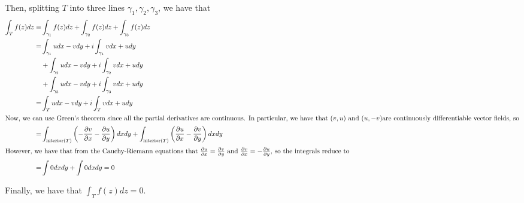 \documentclass[12pt,letterpaper]{article}
\theoremstyle{definition}
\begin{document}
Then, splitting $T$ into three lines $\gamma_{1}, \gamma_{2}, \gamma_{3}$, we have that
\begin{align*}
  \int_{T}f(z)dz =& \int_{\gamma_{1}}f(z)dz + \int_{\gamma_{2}}f(z)dz + \int_{\gamma_{3}}f(z)dz \\
  =& \int_{\gamma_{1}}udx - vdy + i\int_{\gamma_{1}}vdx + udy \\
  &+ \int_{\gamma_{2}}udx - vdy + i\int_{\gamma_{2}}vdx + udy \\
  &+ \int_{\gamma_{3}}udx - vdy + i\int_{\gamma_{3}}vdx + udy \\
  =& \int_{T}udx - vdy + i\int_{T}vdx + udy \\
     \intertext{Now, we can use Green's theorem since all the partial derivatives are continuous. In particular, we have that  $(v,u)$ and $(u,-v)$are continuously differentiable vector fields, so}
  =& \int_{\text{interior}(T)}\left( -\frac{\partial v}{\partial x} - \frac{\partial u}{\partial y}\right)dxdy +  \int_{\text{interior}(T)}\left(\frac{\partial u}{\partial x} - \frac{\partial v}{\partial y}\right)dxdy \\
  \intertext{However, we have that from the Cauchy-Riemann equations that $\frac{\partial u}{\partial x} = \frac{\partial v}{\partial y}$ and $\frac{\partial v}{\partial x} = -\frac{\partial u}{\partial y}$, so the integrals reduce to}
  =& \int 0 dxdy + \int 0 dxdy = 0
\end{align*}

Finally, we have that $\int_{T}f(z)dz = 0$.
\end{document}
